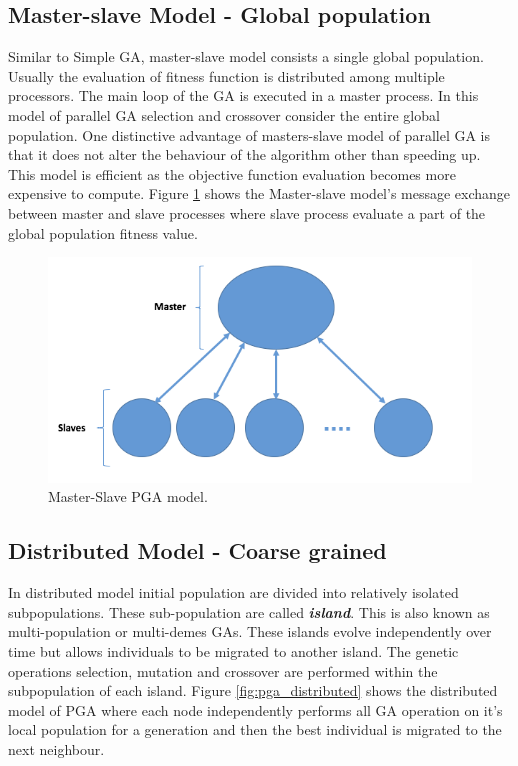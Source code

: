 \subsection{Master-slave Model - Global population}
Similar to Simple GA, master-slave model consists a single global population. Usually the evaluation of fitness function is distributed among multiple processors. The main loop of the GA is executed in a master process. In this model of parallel GA selection and crossover consider the entire global population. One distinctive advantage of masters-slave model of parallel GA is that it does not alter the behaviour of the algorithm other than speeding up. This model is efficient as the objective function evaluation becomes more expensive to compute. Figure \ref{fig:pga_master_slave} shows the Master-slave model's message exchange between master and slave processes where slave process evaluate a part of the global population fitness value.

\begin{figure}[!htb]
\begin{center}
  \includegraphics[width= 0.7 \linewidth]{figs/pga_master_slave.png}
  \caption{Master-Slave PGA model.}
  \label{fig:pga_master_slave}
  \end{center}
\end{figure}

\subsection {Distributed Model - Coarse grained}
In distributed model initial population are divided into relatively isolated subpopulations. These sub-population are called \textbf{\emph{island}}. This is also known as multi-population or multi-demes GAs. These islands evolve independently over time but allows individuals to be migrated to another island. The genetic operations selection, mutation and crossover are performed within the subpopulation of each island. Figure \ref{fig:pga_distributed} shows the distributed model of PGA where each node independently performs all GA operation on it's local population for a generation and then the best individual is migrated to the next neighbour.

